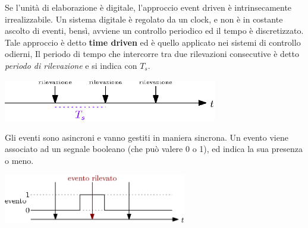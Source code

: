 \documentclass[10pt, letterpaper]{report}
\begin{document}
Se l'unità di elaborazione è digitale, l'approccio event driven è intrinsecamente irrealizzabile. Un sistema digitale è regolato da un clock, e non è in costante ascolto di eventi, bensì, avviene un controllo periodico ed il tempo è discretizzato.\acc 
Tale approccio è detto \textbf{time driven} ed è quello applicato nei sistemi di controllo odierni, Il periodo di tempo che intercorre tra due rilevazioni consecutive è detto \textit{periodo di rilevazione} e si indica con $T_s$.\begin{center}
    \includegraphics[width=0.7\textwidth ]{images/periodoRilevazione.eps}
\end{center}
Gli eventi sono asincroni e vanno gestiti in maniera sincrona. Un evento viene associato ad un segnale booleano (che può valere 0 o 1), ed indica la sua presenza o meno.\begin{center}
    \includegraphics[width=0.6\textwidth ]{images/periodoRilevazione2.eps}
\end{center}
\end{document}
